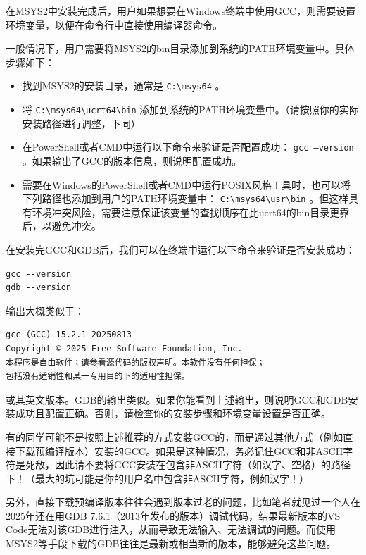 在MSYS2中安装完成后，用户如果想要在Windows终端中使用GCC，则需要设置环境变量，以便在命令行中直接使用编译器命令。

一般情况下，用户需要将MSYS2的bin目录添加到系统的PATH环境变量中。具体步骤如下：

\begin{itemize}
  \item 找到MSYS2的安装目录，通常是 \texttt{C:\textbackslash msys64} 。
  \item 将 \texttt{C:\textbackslash msys64\textbackslash ucrt64\textbackslash bin} 添加到系统的PATH环境变量中。（请按照你的实际安装路径进行调整，下同）
  \item 在PowerShell或者CMD中运行以下命令来验证是否配置成功： \texttt{gcc --version} 。如果输出了GCC的版本信息，则说明配置成功。
  \item 需要在Windows的PowerShell或者CMD中运行POSIX风格工具时，也可以将下列路径也添加到用户的PATH环境变量中： \texttt{C:\textbackslash msys64\textbackslash usr\textbackslash bin} 。但这样具有环境冲突风险，需要注意保证该变量的查找顺序在比ucrt64的bin目录更靠后，以避免冲突。
\end{itemize}

在安装完GCC和GDB后，我们可以在终端中运行以下命令来验证是否安装成功：
\begin{verbatim}
gcc --version
gdb --version
\end{verbatim}

输出大概类似于：
\begin{verbatim}
gcc (GCC) 15.2.1 20250813
Copyright © 2025 Free Software Foundation, Inc.
本程序是自由软件；请参看源代码的版权声明。本软件没有任何担保；
包括没有适销性和某一专用目的下的适用性担保。
\end{verbatim}
或其英文版本。GDB的输出类似。如果你能看到上述输出，则说明GCC和GDB安装成功且配置正确。否则，请检查你的安装步骤和环境变量设置是否正确。

\begin{caution}
  有的同学可能不是按照上述推荐的方式安装GCC的，而是通过其他方式（例如直接下载预编译版本）安装的GCC。如果是这种情况，务必记住GCC和非ASCII字符是死敌，因此请不要将GCC安装在包含非ASCII字符（如汉字、空格）的路径下！（最大的坑可能是你的用户名中包含非ASCII字符，例如汉字！）

  另外，直接下载预编译版本往往会遇到版本过老的问题，比如笔者就见过一个人在2025年还在用GDB 7.6.1（2013年发布的版本）调试代码，结果最新版本的VS Code无法对该GDB进行注入，从而导致无法输入、无法调试的问题。而使用MSYS2等手段下载的GDB往往是最新或相当新的版本，能够避免这些问题。
\end{caution}

